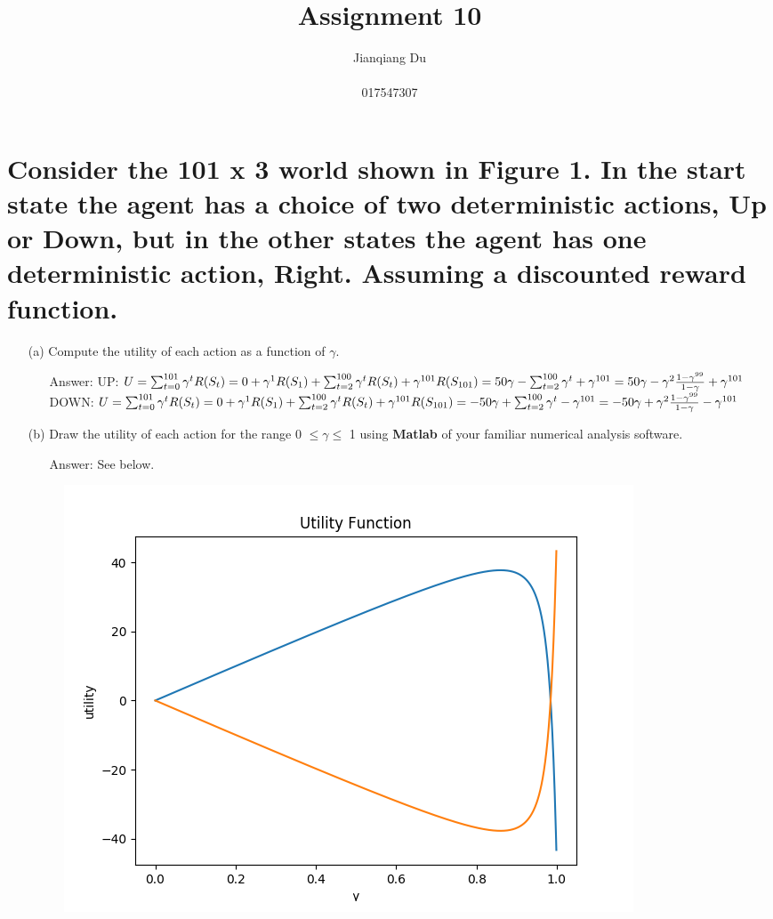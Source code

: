 \documentclass{article}
\begin{document}
\title{\LARGE Assignment 10}
\author{Jianqiang Du\\\\017547307}
\maketitle

\section{Consider the 101 x 3 world shown in Figure 1. In the start state the agent has a choice of two deterministic actions, Up or Down, but in the other states the agent has one deterministic action, Right. Assuming a discounted reward function.}
	\begin{itemize}
		\item[(a)]Compute the utility of each action as a function of $\gamma$.
		\begin{itemize}
			\item[Answer:]UP: $U = \sum_{t=0}^{101}\gamma ^tR(S_t)\\=0+\gamma^1R(S_1)+\sum_{t=2}^{100}\gamma ^tR(S_t)+\gamma^{101}R(S_{101})\\=50\gamma - \sum_{t=2}^{100}\gamma ^t + \gamma^{101}\\=50\gamma - \gamma^2\frac{1-\gamma^{99}}{1-\gamma}+\gamma^{101}$\\DOWN: $U = \sum_{t=0}^{101}\gamma ^tR(S_t)\\=0+\gamma^1R(S_1)+\sum_{t=2}^{100}\gamma ^tR(S_t)+\gamma^{101}R(S_{101})\\=-50\gamma + \sum_{t=2}^{100}\gamma ^t - \gamma^{101}\\=-50\gamma + \gamma^2\frac{1-\gamma^{99}}{1-\gamma}-\gamma^{101}$
		\end{itemize}
		\item[(b)]Draw the utility of each action for the range 0 $\leq \gamma \leq$ 1 using \textbf{Matlab} of your familiar numerical analysis software.
		\begin{itemize}
			\item[Answer:]See below.
		\end{itemize}
		\begin{figure}[h!]
			\centering
			\includegraphics[width=\textwidth]{utility_vs_gamma.png}

\end{figure}
\end{itemize}
\end{document}

